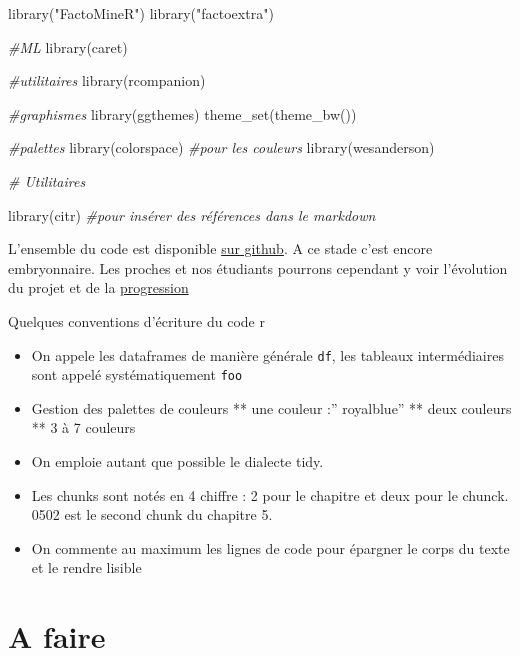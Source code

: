 \documentclass[
]{book}
\newenvironment{Shaded}{\begin{snugshade}}{\end{snugshade}}
\newcommand{\CommentTok}[1]{\textcolor[rgb]{0.56,0.35,0.01}{\textit{#1}}}
\newcommand{\FunctionTok}[1]{\textcolor[rgb]{0.00,0.00,0.00}{#1}}
\newcommand{\NormalTok}[1]{#1}
\newcommand{\StringTok}[1]{\textcolor[rgb]{0.31,0.60,0.02}{#1}}
\providecommand{\tightlist}{%
  \setlength{\itemsep}{0pt}\setlength{\parskip}{0pt}}
\begin{document}
\begin{Shaded}
\begin{Highlighting}[]
\FunctionTok{library}\NormalTok{(}\StringTok{"FactoMineR"}\NormalTok{)}
\FunctionTok{library}\NormalTok{(}\StringTok{"factoextra"}\NormalTok{)}


\CommentTok{\#ML}
\FunctionTok{library}\NormalTok{(caret)}

\CommentTok{\#utilitaires}
\FunctionTok{library}\NormalTok{(rcompanion)}

\CommentTok{\#graphismes}
\FunctionTok{library}\NormalTok{(ggthemes)}
\FunctionTok{theme\_set}\NormalTok{(}\FunctionTok{theme\_bw}\NormalTok{())}


\CommentTok{\#palettes}
\FunctionTok{library}\NormalTok{(colorspace) }\CommentTok{\#pour les couleurs}
\FunctionTok{library}\NormalTok{(wesanderson)}



\CommentTok{\# Utilitaires}

\FunctionTok{library}\NormalTok{(citr) }\CommentTok{\#pour insérer des références dans le markdown}
\end{Highlighting}
\end{Shaded}

L'ensemble du code est disponible \href{https://github.com/BenaventC/Datasciences}{sur github}. A ce stade c'est encore embryonnaire. Les proches et nos étudiants pourrons cependant y voir l'évolution du projet et de la \href{https://benaventc.github.io/Datascience/}{progression}

Quelques conventions d'écriture du code r

\begin{itemize}
\tightlist
\item
  On appele les dataframes de manière générale \texttt{df}, les tableaux intermédiaires sont appelé systématiquement \texttt{foo}
\item
  Gestion des palettes de couleurs
  ** une couleur :'' royalblue''
  ** deux couleurs
  ** 3 à 7 couleurs
\item
  On emploie autant que possible le dialecte tidy.
\item
  Les chunks sont notés en 4 chiffre : 2 pour le chapitre et deux pour le chunck. 0502 est le second chunk du chapitre 5.
\item
  On commente au maximum les lignes de code pour épargner le corps du texte et le rendre lisible
\end{itemize}

\hypertarget{a-faire}{%
\section{A faire}\label{a-faire}}
\end{document}

